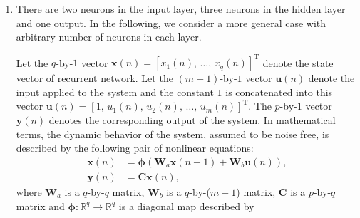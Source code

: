 \begin{enumerate}
\begin{solution}
\begin{enumerate}
\begin{center}
      \end{center}

    \item
        
      There are two neurons in the input layer, three neurons in the
      hidden layer and one output. In the following, we consider a
      more general case with arbitrary number of neurons in each
      layer.

      Let the $q$-by-$1$ vector
      $\mathbf{x}(n)=[x_1(n),\,\ldots,\,x_q(n)]^{\mathrm{T}}$ denote
      the state vector of recurrent network. Let the $(m+1)$-by-$1$
      vector $\mathbf{u}(n)$ denote the input applied to the system
      and the constant $1$ is concatenated into this vector
      $\mathbf{u}(n)=[1,\,u_1(n),\,u_2(n),\,\ldots,\,u_m(n)]^{\mathrm{T}}$.
      The $p$-by-$1$ vector $\mathbf{y}(n)$ denotes the corresponding
      output of the system.  In mathematical terms, the dynamic
      behavior of the system, assumed to be noise free, is described
      by the following pair of nonlinear equations:
      \begin{align*}
        \mathbf{x}(n) &= \boldsymbol\phi \left( \mathbf{W}_a \mathbf{x}(n-1) +
          \mathbf{W}_b \mathbf{u}(n) \right), \\
        \mathbf{y}(n) &= \mathbf{C} \mathbf{x}(n),
      \end{align*}
      where $\mathbf{W}_a$ is a $q$-by-$q$ matrix, $\mathbf{W}_b$ is a
      $q$-by-($m+1$) matrix, $\mathbf{C}$ is a $p$-by-$q$ matrix and
      $\boldsymbol\phi: \mathbb{R}^q \rightarrow \mathbb{R}^q$ is a diagonal map
      described by


\end{enumerate}
\end{solution}
\end{enumerate}
